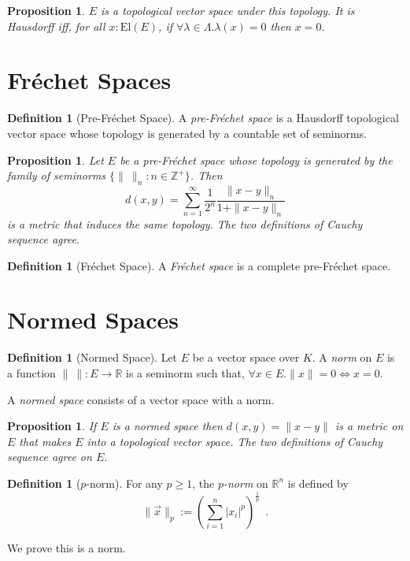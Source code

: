 \documentclass{book}
\newtheorem{prop}[ax]{Proposition}
\theoremstyle{definition}
\newtheorem{df}[ax]{Definition}
\newcommand{\El}[1]{\ensuremath{\mathrm{El} \left( {#1} \right)}}
\begin{document}
\begin{prop}
$E$ is a topological vector space under this topology. It is Hausdorff iff, for all $x : \El{E}$, if $\forall \lambda \in \Lambda. \lambda(x) = 0$ then $x = 0$.
\end{prop}

\section{Fr\'{e}chet Spaces}

\begin{df}[Pre-Fr\'{e}chet Space]
A \emph{pre-Fr\'{e}chet space} is a Hausdorff topological vector space whose topology is generated by a countable set of seminorms.
\end{df}

\begin{prop}
Let $E$ be a pre-Fr\'{e}chet space whose topology is generated by the family of seminorms $\{ \|\ \|_n : n \in \mathbb{Z}^+ \}$. Then
\[ d(x,y) = \sum_{n=1}^\infty \frac{1}{2^n} \frac{\|x-y\|_n}{1 + \|x-y\|_n} \]
is a metric that induces the same topology. The two definitions of Cauchy sequence agree.
\end{prop}

\begin{df}[Fr\'{e}chet Space]
A \emph{Fr\'{e}chet space} is a complete pre-Fr\'{e}chet space.
\end{df}

\section{Normed Spaces}

\begin{df}[Normed Space]
Let $E$ be a vector space over $K$. A \emph{norm} on $E$ is a function $\|\ \| : E \rightarrow \mathbb{R}$ is a seminorm such that, $\forall x \in E. \| x \| = 0 \Leftrightarrow x = 0$.

A \emph{normed space} consists of a vector space with a norm.
\end{df}

\begin{prop}
If $E$ is a normed space then $d(x,y) = \| x - y \|$ is a metric on $E$ that makes $E$ into a topological vector space. The two definitions of Cauchy sequence agree on $E$.
\end{prop}

\begin{df}[$p$-norm]
For any $p \geq 1$, the \emph{$p$-norm} on $\mathbb{R}^n$ is defined by
\[ \| \vec{x} \|_p := \left( \sum_{i=1}^n |x_i|^p \right)^{\frac{1}{p}} \enspace . \]

We prove this is a norm.
\end{df}
\end{document}
